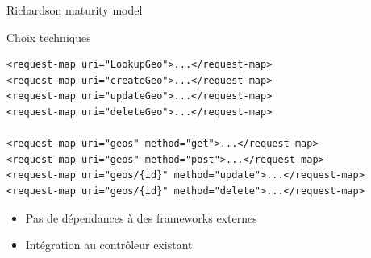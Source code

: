 \documentclass{beamer}
\begin{document}
\begin{frame}{Richardson maturity model}
  \begin{center}
  \end{center}
\end{frame}

\begin{frame}[fragile]{Choix techniques}

  \begin{center}
  \scriptsize
\begin{verbatim}
<request-map uri="LookupGeo">...</request-map>
<request-map uri="createGeo">...</request-map>
<request-map uri="updateGeo">...</request-map>
<request-map uri="deleteGeo">...</request-map>

<request-map uri="geos" method="get">...</request-map>
<request-map uri="geos" method="post">...</request-map>
<request-map uri="geos/{id}" method="update">...</request-map>
<request-map uri="geos/{id}" method="delete">...</request-map>
\end{verbatim}
  \end{center}

  \begin{itemize}
  \item Pas de dépendances à des frameworks externes
  \item Intégration au contrôleur existant
  \end{itemize}
\end{frame}
\end{document}
